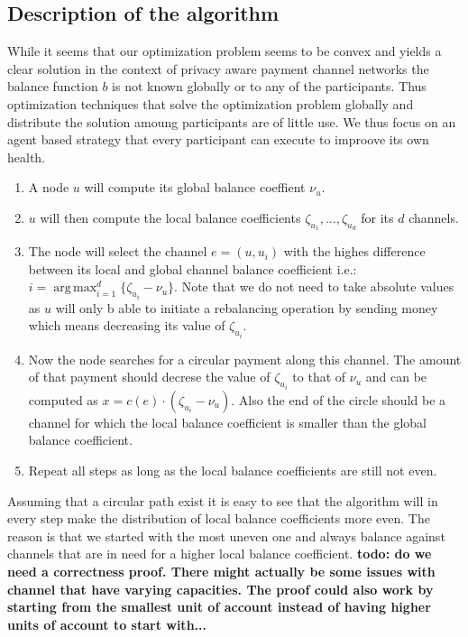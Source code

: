 \documentclass[a4paper]{paper}
\DeclareMathOperator*{\argmax}{arg\,max}
\begin{document}
\subsection{Description of the algorithm}
While it seems that our optimization problem seems to be convex and yields a clear solution in the context of privacy aware payment channel networks the balance function $b$ is not known globally or to any of the participants.
Thus optimization techniques that solve the optimization problem globally and distribute the solution amoung participants are of little use.
We thus focus on an agent based strategy that every participant can execute to improove its own health.
\begin{enumerate}
\item A node $u$ will compute its global balance coeffient $\nu_u$.
\item $u$ will then compute the local balance coefficients $\zeta_{u_1},\dots,\zeta_{u_d}$ for its $d$ channels.
\item The node will select the channel $e=(u,u_i)$ with the highes difference between its local and global channel balance coefficient i.e.: $i = \displaystyle{\argmax_{i=1}^d\{\zeta_{u_i} - \nu_u\}}$. Note that we do not need to take absolute values as $u$ will only b able to initiate a rebalancing operation by sending money which means decreasing its value of $\zeta_{u_i}$.
\item Now the node searches for a circular payment along this channel. The amount of that payment should decrese the value of $\zeta_{u_i}$ to that of $\nu_u$ and can be computed as $x = c(e)\cdot (\zeta_{u_i}-\nu_u)$. Also the end of the circle should be a channel for which the local balance coefficient is smaller than the global balance coefficient. 
 \item Repeat all steps as long as the local balance coefficients are still not even.
\end{enumerate}

Assuming that a circular path exist it is easy to see that the algorithm will in every step make the distribution of local balance coefficients more even.
The reason is that we started with the most uneven one and always balance against channels that are in need for a higher local balance coefficient.
\textbf{todo: do we need a correctness proof. There might actually be some issues with channel that have varying capacities. The proof could also work by starting from the smallest unit of account instead of having higher units of account to start with...}
\end{document}
